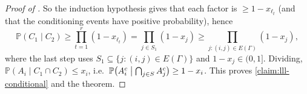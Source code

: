 \begin{proof}[Proof of {}]
    So the induction hypothesis gives that each factor is \(\ge 1 - x_{\ell_{t}}\) (and that the conditioning events have positive probability), hence
    \[
        \mathbb{P}(C_{1} \mid C_{2})
        \ge \prod_{t=1}^{r} (1 - x_{\ell_{t}})
        = \prod_{j \in S_{1}} (1 - x_{j})
        \ge \prod_{j : (i,j) \in E(\Gamma)} (1 - x_{j}) ,
    \]
    where the last step uses \(S_{1} \subseteq \{ j : (i,j) \in E(\Gamma) \}\) and \(1 - x_{j} \in (0,1]\). Dividing, \(\mathbb{P}(A_{i} \mid C_{1} \cap C_{2}) \le x_{i}\), i.e.\ \(\mathbb{P}\bigl( A_{i}^{c} \bigm| \bigcap_{j \in S} A_{j}^{c} \bigr) \ge 1 - x_{i}\). This proves \autoref{claim:lll-conditional} and the theorem.
\end{proof}
